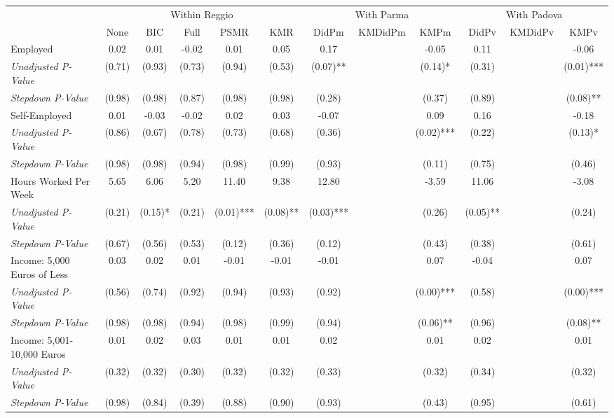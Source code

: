 \begin{tabular}{l c c c c c c c c c c c}
\toprule
& \multicolumn{5}{c}{Within Reggio} & \multicolumn{3}{c}{With Parma} & \multicolumn{3}{c}{With Padova} \\\cmidrule(lr){2-6} \cmidrule(lr){7-9} \cmidrule(lr){10-12}
 & None & BIC & Full & PSMR & KMR & DidPm & KMDidPm & KMPm & DidPv & KMDidPv & KMPv \\
\midrule
Employed & 0.02 & 0.01 & -0.02 & 0.01 & 0.05 & 0.17 & & -0.05 & 0.11 & & -0.06 \\
\quad \textit{Unadjusted P-Value} & (0.71) & (0.93) & (0.73) & (0.94) & (0.53) & (0.07)** & & (0.14)* & (0.31) & & (0.01)*** \\
\quad \textit{Stepdown P-Value} & (0.98) & (0.98) & (0.87) & (0.98) & (0.98) & (0.28) & & (0.37) & (0.89) & & (0.08)** \\
Self-Employed & 0.01 & -0.03 & -0.02 & 0.02 & 0.03 & -0.07 & & 0.09 & 0.16 & & -0.18 \\
\quad \textit{Unadjusted P-Value} & (0.86) & (0.67) & (0.78) & (0.73) & (0.68) & (0.36) & & (0.02)*** & (0.22) & & (0.13)* \\
\quad \textit{Stepdown P-Value} & (0.98) & (0.98) & (0.94) & (0.98) & (0.99) & (0.93) & & (0.11) & (0.75) & & (0.46) \\
Hours Worked Per Week & 5.65 & 6.06 & 5.20 & 11.40 & 9.38 & 12.80 & & -3.59 & 11.06 & & -3.08 \\
\quad \textit{Unadjusted P-Value} & (0.21) & (0.15)* & (0.21) & (0.01)*** & (0.08)** & (0.03)*** & & (0.26) & (0.05)** & & (0.24) \\
\quad \textit{Stepdown P-Value} & (0.67) & (0.56) & (0.53) & (0.12) & (0.36) & (0.12) & & (0.43) & (0.38) & & (0.61) \\
Income: 5,000 Euros of Less & 0.03 & 0.02 & 0.01 & -0.01 & -0.01 & -0.01 & & 0.07 & -0.04 & & 0.07 \\
\quad \textit{Unadjusted P-Value} & (0.56) & (0.74) & (0.92) & (0.94) & (0.93) & (0.92) & & (0.00)*** & (0.58) & & (0.00)*** \\
\quad \textit{Stepdown P-Value} & (0.98) & (0.98) & (0.94) & (0.98) & (0.99) & (0.94) & & (0.06)** & (0.96) & & (0.08)** \\
Income: 5,001-10,000 Euros & 0.01 & 0.02 & 0.03 & 0.01 & 0.01 & 0.02 & & 0.01 & 0.02 & & 0.01 \\
\quad \textit{Unadjusted P-Value} & (0.32) & (0.32) & (0.30) & (0.32) & (0.32) & (0.33) & & (0.32) & (0.34) & & (0.32) \\
\quad \textit{Stepdown P-Value} & (0.98) & (0.84) & (0.39) & (0.88) & (0.90) & (0.93) & & (0.43) & (0.95) & & (0.61) \\

\end{tabular}

